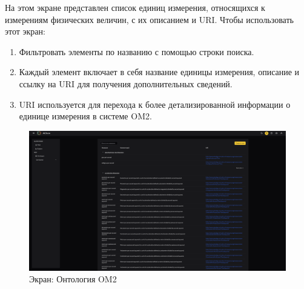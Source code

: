 \documentclass[a4paper,12pt,reqno]{article}
\begin{document}
На этом экране представлен список единиц измерения, относящихся к измерениям физических величин, с их описанием и URI. Чтобы использовать этот экран:
\begin{enumerate}
    \item Фильтровать элементы по названию с помощью строки поиска.
    \item Каждый элемент включает в себя название единицы измерения, описание и ссылку на URI для получения дополнительных сведений.
    \item URI используется для перехода к более детализированной информации о единице измерения в системе OM2.
\end{enumerate}
\begin{figure}[H]
    \centering
    \includegraphics[width=\textwidth]{RO/img/om2_doc.png} %
    \caption{Экран: Онтология OM2}
    \label{fig:om2}
\end{figure}
\end{document}
